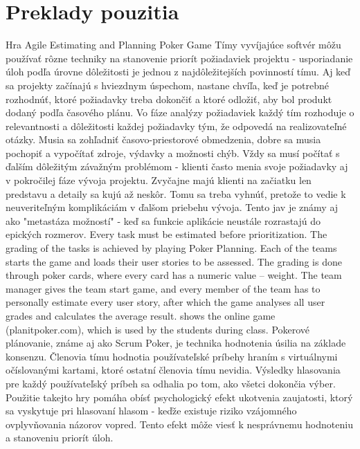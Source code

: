 \documentclass[14pt,twoside,a4paper]{article}
\begin{document}
\section{Preklady pouzitia}
Hra Agile Estimating and Planning Poker Game
\space
Tímy vyvíjajúce softvér môžu používať rôzne techniky na stanovenie priorít 
požiadaviek projektu - usporiadanie úloh podľa úrovne dôležitosti 
je jednou z najdôležitejších povinností tímu. 
Aj keď sa projekty začínajú s hviezdnym úspechom, nastane chvíľa, 
keď je potrebné rozhodnúť, ktoré požiadavky treba dokončiť a ktoré odložiť, 
aby bol produkt dodaný podľa časového plánu.
Vo fáze analýzy požiadaviek každý tím rozhoduje o relevantnosti a dôležitosti 
každej požiadavky tým, že odpovedá na realizovateľné otázky. 
Musia sa zohľadniť časovo-priestorové obmedzenia, 
dobre sa musia pochopiť a vypočítať zdroje, výdavky a možnosti chýb. 
Vždy sa musí počítať s ďalším dôležitým závažným problémom - klienti 
často menia svoje požiadavky aj v pokročilej fáze vývoja projektu. 
Zvyčajne majú klienti na začiatku len predstavu a detaily sa kujú až neskôr. 
Tomu sa treba vyhnúť, pretože to vedie k neuveriteľným komplikáciám v ďalšom 
priebehu vývoja. Tento jav je známy aj ako "metastáza možností" - keď sa 
funkcie aplikácie neustále rozrastajú do epických rozmerov.
Every task must be estimated before prioritization. 
The grading of the tasks is achieved by playing Poker Planning. 
Each of the teams starts the game and loads their user stories to be assessed. 
The grading is done through poker cards, where every card has a numeric value – weight.
The team manager gives the team start game, and every member of the team has 
to personally estimate every user story, after which the game analyses all 
user grades and calculates the average result. 
shows the online game (planitpoker.com), 
which is used by the students during class.
Pokerové plánovanie, známe aj ako Scrum Poker, je technika hodnotenia 
úsilia na základe konsenzu. 
Členovia tímu hodnotia používateľské príbehy hraním s 
virtuálnymi očíslovanými kartami, ktoré ostatní členovia tímu nevidia. 
Výsledky hlasovania pre každý používateľský príbeh sa odhalia po tom, 
ako všetci dokončia výber. Použitie takejto hry pomáha obísť 
psychologický efekt ukotvenia zaujatosti, ktorý sa vyskytuje pri 
hlasovaní hlasom - keďže existuje riziko vzájomného ovplyvňovania 
názorov vopred. Tento efekt môže viesť k nesprávnemu hodnoteniu a 
stanoveniu priorít úloh\cite{8757200}.
\end{document}
